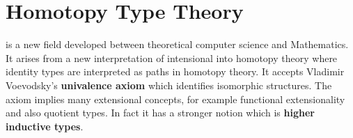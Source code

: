 











\section{Homotopy Type Theory}

\hott is a new field developed between theoretical computer science
and Mathematics.
It arises from a new interpretation of intensional \mltt
into homotopy theory where identity types are interpreted as paths in homotopy theory.
It accepts Vladimir Voevodsky's \textbf{univalence axiom} which identifies isomorphic
structures. The axiom implies many extensional concepts, for example functional extensionality and also quotient types. In fact it has a stronger notion which is \textbf{higher inductive types}.


